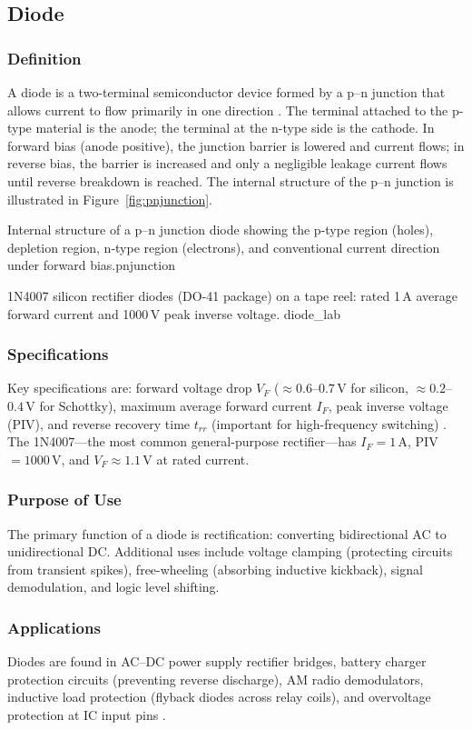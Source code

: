 \subsection{Diode}

\subsubsection*{Definition}
A diode is a two-terminal semiconductor device formed by a p--n junction that allows
current to flow primarily in one direction \cite{boylestad2015}. The terminal attached
to the p-type material is the anode; the terminal at the n-type side is the cathode. In
forward bias (anode positive), the junction barrier is lowered and current flows; in
reverse bias, the barrier is increased and only a negligible leakage current flows until
reverse breakdown is reached. The internal structure of the p--n junction is illustrated
in Figure~\ref{fig:pnjunction}.

%
  {Internal structure of a p--n junction diode showing the p-type region
   (holes), depletion region, n-type region (electrons), and conventional
   current direction under forward bias.}{pnjunction}

%
  {1N4007 silicon rectifier diodes (DO-41 package) on a tape reel: rated
   1\,A average forward current and 1000\,V peak inverse voltage.}%
  {diode_lab}

\subsubsection*{Specifications}
Key specifications are: forward voltage drop $V_F$ ($\approx 0.6$--$0.7$\,V for silicon,
$\approx 0.2$--$0.4$\,V for Schottky), maximum average forward current $I_F$, peak
inverse voltage (PIV), and reverse recovery time $t_{rr}$ (important for high-frequency
switching) \cite{sedra2020}. The 1N4007---the most common general-purpose rectifier---has
$I_F = 1$\,A, PIV $= 1000$\,V, and $V_F \approx 1.1$\,V at rated current.

\subsubsection*{Purpose of Use}
The primary function of a diode is rectification: converting bidirectional AC to
unidirectional DC. Additional uses include voltage clamping (protecting circuits from
transient spikes), free-wheeling (absorbing inductive kickback), signal demodulation,
and logic level shifting.

\subsubsection*{Applications}
Diodes are found in AC--DC power supply rectifier bridges, battery charger protection
circuits (preventing reverse discharge), AM radio demodulators, inductive load protection
(flyback diodes across relay coils), and overvoltage protection at IC input pins
\cite{floyd2012}.
